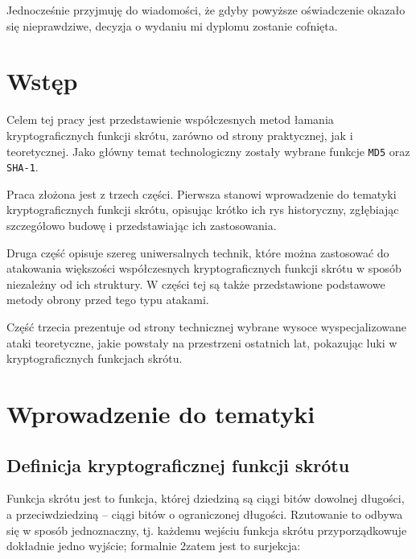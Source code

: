 \documentclass[12pt,a4paper,twoside]{article}
\begin{document}
Jednocześnie przyjmuję do wiadomości, że gdyby powyższe oświadczenie okazało
się nieprawdziwe, decyzja o wydaniu mi dyplomu zostanie cofnięta.


\newpage
\setcounter{tocdepth}{3}
\tableofcontents

\newpage
\pagestyle{fancy}


\section{Wstęp}
Celem tej pracy jest przedstawienie współczesnych metod łamania
kryptograficznych funkcji skrótu, zarówno od strony praktycznej, jak i
teoretycznej. Jako główny temat technologiczny zostały wybrane funkcje
\texttt{MD5} oraz \texttt{SHA-1}.

Praca złożona jest z trzech części. Pierwsza stanowi wprowadzenie do tematyki
kryptograficznych funkcji skrótu, opisując krótko ich rys historyczny,
zgłębiając szczegółowo budowę i przedstawiając ich zastosowania.

Druga część opisuje szereg uniwersalnych technik, które można zastosować do
atakowania większości współczesnych kryptograficznych funkcji skrótu w sposób
niezależny od ich struktury. W części tej są także przedstawione podstawowe
metody obrony przed tego typu atakami.

Część trzecia prezentuje od strony technicznej wybrane wysoce wyspecjalizowane
ataki teoretyczne, jakie powstały na przestrzeni ostatnich lat, pokazując luki
w kryptograficznych funkcjach skrótu.

\newpage



\section{Wprowadzenie do tematyki}

\subsection{Definicja kryptograficznej funkcji skrótu}

Funkcja skrótu jest to funkcja, której dziedziną są ciągi bitów dowolnej
długości, a przeciwdziedziną -- ciągi bitów o ograniczonej długości. Rzutowanie
to odbywa się w sposób jednoznaczny, tj. każdemu wejściu funkcja skrótu
przyporządkowuje dokładnie jedno wyjście; formalnie 2zatem jest to surjekcja:
\end{document}

